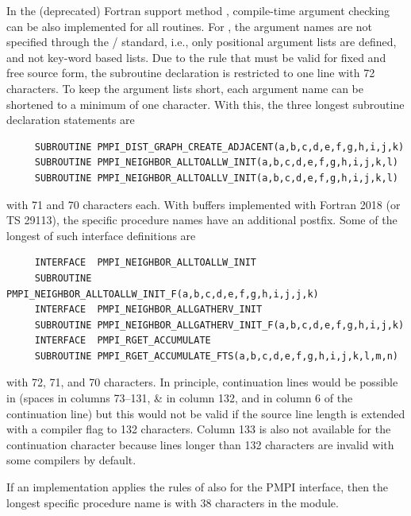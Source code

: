 \begin{implementors}
In the (deprecated) Fortran support method ,
compile-time argument checking
can be also implemented for all routines.
For , the argument names are not specified through the \MPI/ standard,
i.e., only positional argument lists are defined, and not key-word based lists.
Due to the rule that 
must be valid for fixed and free source form,
the subroutine declaration is restricted to one line with 72 characters.
To keep the argument lists short, each argument name can be shortened
to a minimum of one character. With this, the three longest subroutine
declaration statements are
\begin{verbatim}
     SUBROUTINE PMPI_DIST_GRAPH_CREATE_ADJACENT(a,b,c,d,e,f,g,h,i,j,k)
     SUBROUTINE PMPI_NEIGHBOR_ALLTOALLW_INIT(a,b,c,d,e,f,g,h,i,j,k,l)
     SUBROUTINE PMPI_NEIGHBOR_ALLTOALLV_INIT(a,b,c,d,e,f,g,h,i,j,k,l)
\end{verbatim}
with 71 and 70 characters each.
With buffers implemented with Fortran 2018 (or TS 29113),
the specific procedure names have an
additional postfix. Some of the longest of such interface definitions are
\begin{verbatim}
     INTERFACE  PMPI_NEIGHBOR_ALLTOALLW_INIT
     SUBROUTINE PMPI_NEIGHBOR_ALLTOALLW_INIT_F(a,b,c,d,e,f,g,h,i,j,j,k)
     INTERFACE  PMPI_NEIGHBOR_ALLGATHERV_INIT
     SUBROUTINE PMPI_NEIGHBOR_ALLGATHERV_INIT_F(a,b,c,d,e,f,g,h,i,j,k)
     INTERFACE  PMPI_RGET_ACCUMULATE
     SUBROUTINE PMPI_RGET_ACCUMULATE_FTS(a,b,c,d,e,f,g,h,i,j,k,l,m,n)
\end{verbatim}
with 72, 71, and 70 characters.
In principle, continuation lines would be possible in 
(spaces in columns 73--131, \& in column 132, and in column 6 of the
continuation line) but this would not be valid if the source line
length is extended with a compiler flag to 132 characters.
Column 133 is also not available for the continuation character because
lines longer than 132 characters are invalid with some compilers by default.

If an implementation applies the rules of
 also for the PMPI
interface, then the longest specific procedure name is
with 38 characters in the  module.



\end{implementors}
